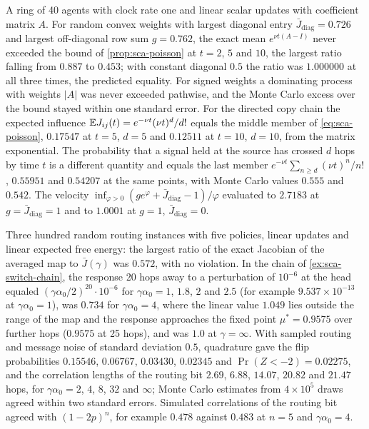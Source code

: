 \begin{numcheck}\label{chk:sca-poisson}
A ring of 40 agents with clock rate one and linear scalar updates with coefficient matrix $A$. For random convex weights with largest diagonal entry $\bar J_{\mathrm{diag}}=0.726$ and largest off-diagonal row sum $g=0.762$, the exact mean $e^{\nu t(A-I)}$ never exceeded the bound of \cref{prop:sca-poisson} at $t=2$, $5$ and $10$, the largest ratio falling from $0.887$ to $0.453$; with constant diagonal $0.5$ the ratio was $1.000000$ at all three times, the predicted equality. For signed weights a dominating process with weights $|A|$ was never exceeded pathwise, and the Monte Carlo excess over the bound stayed within one standard error. For the directed copy chain the expected influence $\mathbb{E} J_{ij}(t)=e^{-\nu t}(\nu t)^d/d!$ equals the middle member of \eqref{eq:sca-poisson}, $0.17547$ at $t=5$, $d=5$ and $0.12511$ at $t=10$, $d=10$, from the matrix exponential. The probability that a signal held at the source has crossed $d$ hops by time $t$ is a different quantity and equals the last member $e^{-\nu t}\sum_{n\ge d}(\nu t)^n/n!$, $0.55951$ and $0.54207$ at the same points, with Monte Carlo values $0.555$ and $0.542$. The velocity $\inf_{\varphi>0}(ge^\varphi+\bar J_{\mathrm{diag}}-1)/\varphi$ evaluated to $2.7183$ at $g=\bar J_{\mathrm{diag}}=1$ and to $1.0001$ at $g=1$, $\bar J_{\mathrm{diag}}=0$.
\end{numcheck}

\begin{numcheck}\label{chk:sca-routing}
Three hundred random routing instances with five policies, linear updates and linear expected free energy: the largest ratio of the exact Jacobian of the averaged map to $\bar J(\gamma)$ was $0.572$, with no violation. In the chain of \cref{ex:sca-switch-chain}, the response 20 hops away to a perturbation of $10^{-6}$ at the head equaled $(\gamma\alpha_0/2)^{20}\cdot10^{-6}$ for $\gamma\alpha_0=1$, $1.8$, $2$ and $2.5$ (for example $9.537\times10^{-13}$ at $\gamma\alpha_0=1$), was $0.734$ for $\gamma\alpha_0=4$, where the linear value $1.049$ lies outside the range of the map and the response approaches the fixed point $\mu^\ast=0.9575$ over further hops ($0.9575$ at 25 hops), and was $1.0$ at $\gamma=\infty$. With sampled routing and message noise of standard deviation $0.5$, quadrature gave the flip probabilities $0.15546$, $0.06767$, $0.03430$, $0.02345$ and $\Pr(Z<-2)=0.02275$, and the correlation lengths of the routing bit $2.69$, $6.88$, $14.07$, $20.82$ and $21.47$ hops, for $\gamma\alpha_0=2$, $4$, $8$, $32$ and $\infty$; Monte Carlo estimates from $4\times10^5$ draws agreed within two standard errors. Simulated correlations of the routing bit agreed with $(1-2p)^n$, for example $0.478$ against $0.483$ at $n=5$ and $\gamma\alpha_0=4$.
\end{numcheck}


